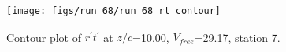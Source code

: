 \begin{figure}[H]
\centering
\texttt{[image: figs/run\_68/run\_68\_rt\_contour]}
\caption{Contour plot of $\overline{r^\prime t^\prime}$ at $z/c$=10.00, $V_{free}$=29.17, station 7.}
\end{figure}


